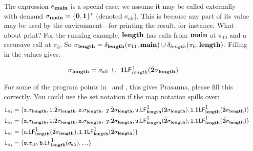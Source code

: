 \documentclass[9pt]{sigplanconf}
\begin{document}
The expression $e_{\mathbf{main}}$  is a special case; we  assume it may be
called externally with demand $\sigma_{\mathbf{main}} = \{\mathbf{0},\mathbf{1}\}^\ast$
(denoted $\sigma_{\!all}$).  This is because any part of its value may
be used by the environment---for printing the result, for instance.
{\color {red} What about print?}
For the running example, $\mathbf{length}$ has calls from $\mathbf{main}$ at $\pi_{10}$
and a recursive call at $\pi_6$.
So $\sigma_{\mathbf{length}} =
     \delta_{\mathbf{length}}({\pi_{11}},{\mathbf{main}})  \cup \delta_{length}({\pi_6},{\mathbf{length}})$.
Filling in  the values gives:

\begin{align*}
\sigma_{\mathbf{length}}    &=
 \sigma_{\!all}  ~\cup~ \mathbf{1}\mathsf{LF}_{\mathit length}^{1}( {\mathit {\bar{\mathbf{2}}}\sigma_{\mathit{\mathbf{length}}}})
\end{align*}

For some of the program points in \length\  and \main,  this gives
{\color {red} Prasanna, please fill this correctly}. You could use the
set notation if the map notation spills over: 
\begin{align*}
\mathsf{L}_{{\pi_1}} &= \lbrace  \mbox{\tt x}.\sigma_{\mathbf{length}}, \mbox{\tt l}.\bar{\mathbf{2}}\sigma_{\mathbf{length}}, \mbox{\tt z}.\sigma_{\mathbf{length}},\
              \mbox{\tt y}.\bar{\mathbf{2}}\sigma_{\mathbf{length}}, \mbox{\tt u}.\mathsf{LF}_{\mathit {\mathbf{length}}}^{\mbox{1}}( {\mathit {\bar{\mathbf{2}}}\sigma_{\mathbf{length}}}), \mbox{\tt l}.\mathbf{1}\mathsf{LF}_{\mathit {\mathbf{length}}}^{\mbox{1}}( {\mathit {\bar{\mathbf{2}}}\sigma_{\mathbf{length}}}) \rbrace \\
\mathsf{L}_{{\pi_2}} & =  \lbrace  \mbox{\tt x}.\sigma_{\mathbf{length}}, \mbox{\tt l}.\bar{\mathbf{2}}\sigma_{\mathbf{length}}, \mbox{\tt z}.\sigma_{\mathbf{length}},\
                  \mbox{\tt y}.\bar{\mathbf{2}}\sigma_{\mathbf{length}}, \mbox{\tt u}.\mathsf{LF}_{\mathit {\mathbf{length}}}^{\mbox{1}}( {\mathit {\bar{\mathbf{2}}}\sigma_{\mathbf{length}}}), \mbox{\tt l}.\mathbf{1}\mathsf{LF}_{\mathit {\mathbf{length}}}^{\mbox{1}}( {\mathit {\bar{\mathbf{2}}}\sigma_{\mathbf{length}}}) \rbrace \\
\mathsf{L}_{{\pi_5}} &= \lbrace \mbox{\tt u}.\mathsf{LF}_{\mathit {\mathbf{length}}}^{\mbox{1}}( {\mathit {\bar{\mathbf{2}}}\sigma_{\mathbf{length}}}), \mbox{\tt l}.\mathbf{1}\mathsf{LF}_{\mathit {\mathbf{length}}}^{\mbox{1}}( {\mathit {\bar{\mathbf{2}}}\sigma_{\mathbf{length}}})\rbrace \\
\mathsf{L}_{{\pi_8}} &= \lbrace \mbox{\tt w}.\sigma_{\mathit{\!all}}, \mbox{\tt b}.\mathsf{LF}_{\mathit {\mathbf{length}}}^{\mbox{1}}( {\mathit \sigma_{\mathit{\!all}}}), \ldots  \rbrace 
\end{align*}
\end{document}
